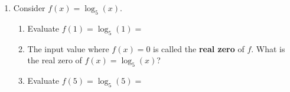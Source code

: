 \documentclass[10pt]{article}
\begin{document}
\begin{enumerate}[leftmargin=1.8em, itemsep=16pt]
\item Consider $f(x) = \log_5(x)$.

\begin{enumerate}[leftmargin=1.5em, itemsep=8pt, label=\alph*.]
  \item Evaluate $f(1) = \log_5(1) = $ \blank{2cm}

  \item The input value where $f(x) = 0$ is called the \textbf{real zero} of $f$.
        What is the real zero of $f(x) = \log_5(x)$? \blank{2cm}

  \item Evaluate $f(5) = \log_5(5) = $ \blank{2cm}
\end{enumerate}

\end{enumerate}
\end{document}
